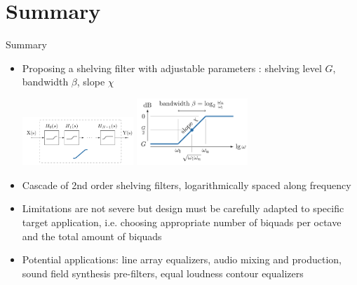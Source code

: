 \documentclass[mathserif,aspectratio=169]{beamer}
\begin{document}
\section{Summary}
%
\begin{frame}{Summary}
\begin{itemize}
  \item Proposing a shelving filter with adjustable
  parameters
  : shelving level $G$, \quad bandwidth $\beta$, \quad
  slope $\chi$
  \begin{center}
  \includegraphics[width=0.33\textwidth,trim=7.5cm 0 0 0]{Fig1a.png}
  \includegraphics[width=0.33\textwidth,trim=0 0 0 0]{Fig1c.png}
  \end{center}
\item Cascade of 2nd order shelving filters, logarithmically spaced along frequency
\item Limitations are not severe but design must be carefully adapted to specific
target application, i.e. choosing appropriate number of biquads per octave and
the total amount of biquads
\item Potential applications: line array equalizers, audio mixing and production,
sound field synthesis pre-filters, equal loudness contour equalizers
\end{itemize}






\end{frame}
\end{document}
